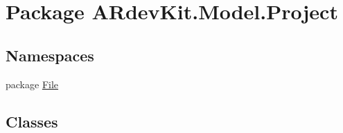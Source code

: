 \hypertarget{namespace_a_rdev_kit_1_1_model_1_1_project}{\section{Package A\-Rdev\-Kit.\-Model.\-Project}
\label{namespace_a_rdev_kit_1_1_model_1_1_project}
}
\subsection*{Namespaces}
\begin{DoxyCompactItemize}
\item 
package \hyperlink{namespace_a_rdev_kit_1_1_model_1_1_project_1_1_file}{File}
\end{DoxyCompactItemize}
\subsection*{Classes}
